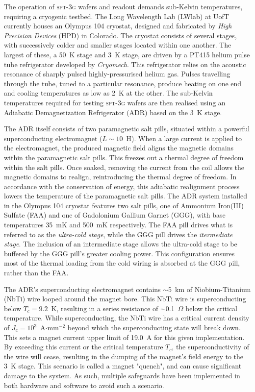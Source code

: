 \documentclass[iop]{emulateapj}
\begin{document}
The operation of \textsc{spt-3g} wafers and readout demands sub-Kelvin temperatures, requiring a cryogenic testbed.  The Long Wavelength Lab (LWlab) at UofT currently houses an Olympus 104 cryostat, designed and fabricated by \textit{High Precision Devices} (HPD) in Colorado.  The cryostat consists of several stages, with successively colder and smaller stages located within one another.  The largest of these, a 50~K stage and 3~K stage, are driven by a PT415 helium pulse tube refrigerator developed by \textit{Cryomech}.  This refrigerator relies on the acoustic resonance of sharply pulsed highly-pressurised helium gas.  Pulses travelling through the tube, tuned to a particular resonance, produce heating on one end and cooling temperatures as low as 2~K at the other.  The sub-Kelvin temperatures required for testing \textsc{spt-3g} wafers are then realised using an Adiabatic Demagnetization Refrigerator (ADR) based on the 3~K stage.  

The ADR itself consists of two paramagnetic salt pills, situated within a powerful superconducting electromagnet ($L\sim10$~H).  When a large current is applied to the electromagnet, the produced magnetic field aligns the magnetic domains within the paramagnetic salt pills.  This freezes out a thermal degree of freedom within the salt pills.  Once soaked, removing the current from the coil allows the magnetic domains to realign, reintroducing the thermal degree of freedom.  In accordance with the conservation of energy, this adiabatic realignment process lowers the temperature of the paramagnetic salt pills.  The ADR system installed in the Olympus 104 cryostat features two salt pills, one of Ammonium Iron(III) Sulfate (FAA) and one of Gadolonium Gallium Garnet (GGG), with base temperatures 35~mK and 500~mK respectively.  The FAA pill drives what is referred to as the \textit{ultra-cold stage}, while the GGG pill drives the \textit{itermediate stage}.  The inclusion of an intermediate stage allows the ultra-cold stage to be buffered by the GGG pill's greater cooling power.  This configuration ensures most of the thermal loading from the cold wiring is absorbed at the GGG pill, rather than the FAA.  

The ADR's superconducting electromagnet contains $\sim$5~km of Niobium-Titanium (NbTi) wire looped around the magnet bore.  This NbTi wire is superconducting below $T_c=9.2$~K, resulting in a series resistance of $\sim$0.1~$\Omega$ below the critical temperature.  While superconducting, the NbTi wire has a critical current density of $J_c=10^3$~A$\cdot$mm$^{-2}$ beyond which the superconducting state will break down.  This sets a magnet current upper limit of 19.0~A for this given implementation.  By exceeding this current or the critical temperature $T_c$, the superconductivity of the wire will cease, resulting in the dumping of the magnet's field energy to the 3~K stage.  This scenario is called a magnet "quench", and can cause significant damage to the system.  As such, multiple safeguards have been implemented in both hardware and software to avoid such a scenario.
\end{document}
